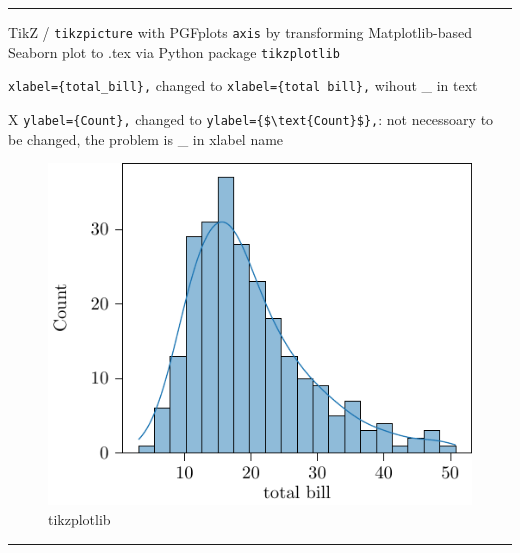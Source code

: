 \documentclass[
]{book}
\theoremstyle{definition}
\theoremstyle{definition}
\theoremstyle{definition}
\theoremstyle{definition}
\theoremstyle{remark}
\begin{document}
\begin{center}\rule{0.5\linewidth}{0.5pt}\end{center}

TikZ / \texttt{tikzpicture} with PGFplots \texttt{axis} by transforming Matplotlib-based Seaborn plot to .tex via Python package \texttt{tikzplotlib}

\texttt{xlabel=\{total\_bill\},} changed to \texttt{xlabel=\{total\ bill\},} wihout \_ in text

X \texttt{ylabel=\{Count\},} changed to \texttt{ylabel=\{\$\textbackslash{}text\{Count\}\$\},}: not necessoary to be changed, the problem is \_ in xlabel name

\begin{figure}
\centering
\includegraphics{202403181222-MatPlotLib_files/figure-latex/unnamed-chunk-78-1.pdf}
\caption{\label{fig:unnamed-chunk-78}tikzplotlib}
\end{figure}

\begin{center}\rule{0.5\linewidth}{0.5pt}\end{center}
\end{document}
